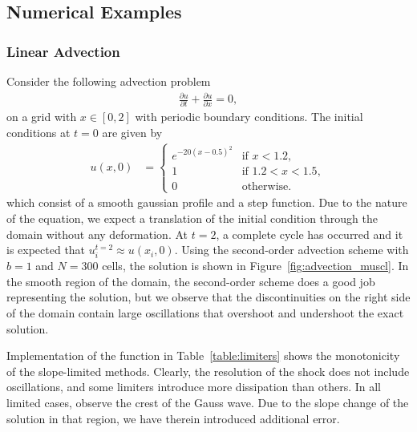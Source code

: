 \subsection{Numerical Examples}
\subsubsection{Linear Advection}
Consider the following advection problem
\begin{align}
	\frac{\partial u}{\partial t} + \frac{\partial u}{\partial x} = 0,
\end{align}
on a grid with $x\in[0,2]$ with periodic boundary conditions. The initial conditions at $t=0$ are given by
\begin{align}
	u(x, 0) &= 
	\begin{cases}
		e^{-20(x-0.5)^2} & \text{if } x < 1.2, \\ 
		1 & \text{if } 1.2 < x < 1.5,	 \\
		0 & \text{otherwise}.
	\end{cases}
\end{align}
which consist of a smooth gaussian profile and a step function. Due to the nature of the equation, we expect a translation of the initial condition through the domain without any deformation. At $t=2$, a complete cycle has occurred and it is expected that $u_i^{t=2}\approx u(x_i,0)$. Using the second-order advection scheme with $b=1$ and $N=300$ cells, the solution is shown in Figure~\ref{fig:advection_muscl}. In the smooth region of the domain, the second-order scheme does a good job representing the solution, but we observe that the discontinuities on the right side of the domain contain large oscillations that overshoot and undershoot the exact solution. 

Implementation of the function in Table~\ref{table:limiters} shows the monotonicity of the slope-limited methods. Clearly, the resolution of the shock does not include oscillations, and some limiters introduce more dissipation than others. In all limited cases, observe the crest of the Gauss wave. Due to the slope change of the solution in that region, we have therein introduced additional error.

